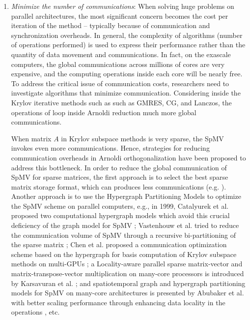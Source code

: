 {\begin{enumerate}[label=(\arabic*)]
    \item \textit{Minimize the number of communications}: When solving huge problems on parallel architectures, the most significant concern becomes the cost per iteration of the method -- typically because of communication and synchronization overheads. In general, the complexity of algorithms (number of operations performed) is used to express their performance rather than the quantity of data movement and communications. In fact, on the exascale computers, the global communications across millions of cores are very expensive, and the computing operations inside each core will be nearly free. To address the critical issue of communication costs, researchers need to investigate algorithms that minimize communication. Considering inside the Krylov iterative methods such as such as GMRES, CG, and Lanczos, the operations of loop inside Arnoldi reduction much more global communications. 
	
    When matrix $A$ in Krylov subspace methods is very sparse, the SpMV invokes even more communications. Hence, strategies for reducing communication overheads in Arnoldi orthogonalization have been proposed to address this bottleneck. In order to reduce the global communication of SpMV for sparse matrices, the first approach is to select the best sparse matrix storage format, which can produces less communications (e.g. \cite{montagne2004optimal, liu2015csr5,stathis2003hierarchical,merrill2016merge,bell2008efficient, bell2009implementing,kreutzer2014unified,ashari2014efficient}). Another approach is to use the Hypergraph Partitioning Models to optimize the SpMV scheme on parallel computers, e.g., in 1999, Catalyurek et al. proposed two computational hypergraph models which avoid this crucial deficiency of the graph model for SpMV \cite{catalyurek1999hypergraph}; Vastenhouw et al. tried to reduce the communication volume of SpMV through a recursive bi-partitioning of the sparse matrix \cite{vastenhouw2005two}; Chen et al. proposed a communication optimization scheme based on the hypergraph for basis computation of Krylov subspace methods on multi-GPUs \cite{chen2014communication}; a Locality-aware parallel sparse matrix-vector and matrix-transpose-vector multiplication on many-core processors is introduced by Karsavuran et al. \cite{karsavuran2016locality}; and spatiotemporal graph and hypergraph partitioning models for SpMV on many-core architectures is presented by Abubaker et al. with better scaling performance through enhancing data locality in the operations \cite{abubaker2018spatiotemporal}, etc.
	

\end{enumerate}}
